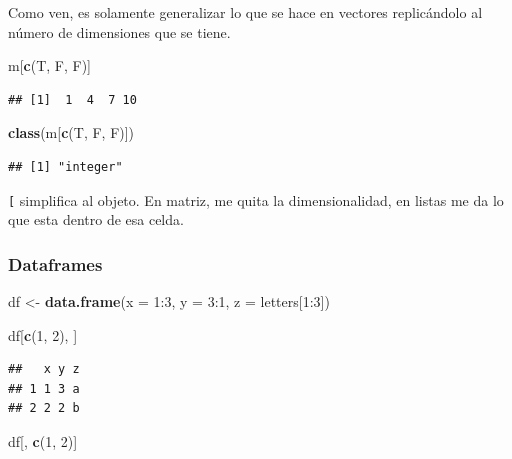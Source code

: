 \documentclass[]{article}
\newenvironment{Shaded}{\begin{snugshade}}{\end{snugshade}}
\newcommand{\KeywordTok}[1]{\textcolor[rgb]{0.13,0.29,0.53}{\textbf{{#1}}}}
\newcommand{\DataTypeTok}[1]{\textcolor[rgb]{0.13,0.29,0.53}{{#1}}}
\newcommand{\DecValTok}[1]{\textcolor[rgb]{0.00,0.00,0.81}{{#1}}}
\newcommand{\StringTok}[1]{\textcolor[rgb]{0.31,0.60,0.02}{{#1}}}
\newcommand{\NormalTok}[1]{{#1}}
\begin{document}
Como ven, es solamente generalizar lo que se hace en vectores
replicándolo al número de dimensiones que se tiene.

\begin{Shaded}
\begin{Highlighting}[]
\NormalTok{m[}\KeywordTok{c}\NormalTok{(T, F, F)]}
\end{Highlighting}
\end{Shaded}

\begin{verbatim}
## [1]  1  4  7 10
\end{verbatim}

\begin{Shaded}
\begin{Highlighting}[]
\KeywordTok{class}\NormalTok{(m[}\KeywordTok{c}\NormalTok{(T, F, F)])}
\end{Highlighting}
\end{Shaded}

\begin{verbatim}
## [1] "integer"
\end{verbatim}

\texttt{{[}} simplifica al objeto. En matriz, me quita la
dimensionalidad, en listas me da lo que esta dentro de esa celda.

\subsubsection{Dataframes}\label{dataframes}

\begin{Shaded}
\begin{Highlighting}[]
\NormalTok{df <-}\StringTok{ }\KeywordTok{data.frame}\NormalTok{(}\DataTypeTok{x =} \DecValTok{1}\NormalTok{:}\DecValTok{3}\NormalTok{, }\DataTypeTok{y =} \DecValTok{3}\NormalTok{:}\DecValTok{1}\NormalTok{, }\DataTypeTok{z =} \NormalTok{letters[}\DecValTok{1}\NormalTok{:}\DecValTok{3}\NormalTok{])}

\NormalTok{df[}\KeywordTok{c}\NormalTok{(}\DecValTok{1}\NormalTok{, }\DecValTok{2}\NormalTok{), ]}
\end{Highlighting}
\end{Shaded}

\begin{verbatim}
##   x y z
## 1 1 3 a
## 2 2 2 b
\end{verbatim}

\begin{Shaded}
\begin{Highlighting}[]
\NormalTok{df[, }\KeywordTok{c}\NormalTok{(}\DecValTok{1}\NormalTok{, }\DecValTok{2}\NormalTok{)]}
\end{Highlighting}
\end{Shaded}
\end{document}
